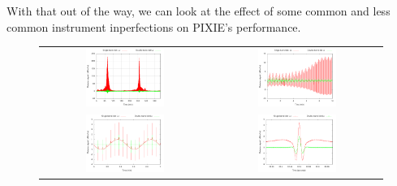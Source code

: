 \documentclass{article}
\begin{document}
With that out of the way, we can look at the effect of some
common and less common instrument inperfections on PIXIE's
performance.
\begin{figure}
	\centering
	\begin{tabular}{cc}
		\includegraphics[width=0.48\textwidth,trim=8mm 0 0mm 0mm]{plots/tod000_full.png} &
		\includegraphics[width=0.48\textwidth,trim=8mm 0 0mm 0mm]{plots/tod000_10min.png} \\
		\includegraphics[width=0.48\textwidth,trim=8mm 0 0mm 0mm]{plots/tod000_1min.png} &
		\includegraphics[width=0.48\textwidth,trim=8mm 0 0mm 0mm]{plots/tod000_stroke.png}
	\end{tabular}

\end{figure}
\end{document}
